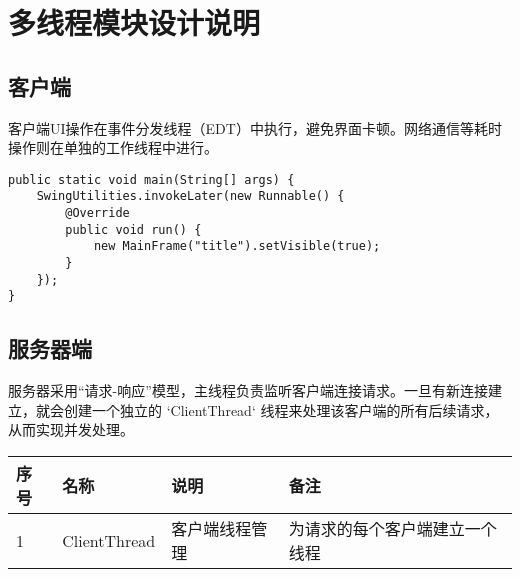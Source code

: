 \documentclass[a4paper]{ctexart}
\begin{document}
\section{多线程模块设计说明}
\subsection{客户端}
客户端UI操作在事件分发线程（EDT）中执行，避免界面卡顿。网络通信等耗时操作则在单独的工作线程中进行。
\begin{lstlisting}
public static void main(String[] args) {
    SwingUtilities.invokeLater(new Runnable() {
        @Override
        public void run() {
            new MainFrame("title").setVisible(true);
        }
    });
}
\end{lstlisting}

\subsection{服务器端}
服务器采用“请求-响应”模型，主线程负责监听客户端连接请求。一旦有新连接建立，就会创建一个独立的 `ClientThread` 线程来处理该客户端的所有后续请求，从而实现并发处理。

\begin{tabular}{llll}
    \toprule
    \textbf{序号} & \textbf{名称}  & \textbf{说明} & \textbf{备注}     \\
    \midrule
    1           & ClientThread & 客户端线程管理     & 为请求的每个客户端建立一个线程 \\
    \bottomrule
\end{tabular}
\end{document}
